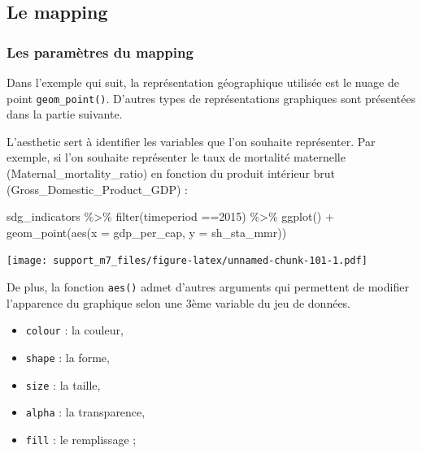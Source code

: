 \documentclass[
]{book}
\newenvironment{Shaded}{\begin{snugshade}}{\end{snugshade}}
\newcommand{\AttributeTok}[1]{\textcolor[rgb]{0.77,0.63,0.00}{#1}}
\newcommand{\DecValTok}[1]{\textcolor[rgb]{0.00,0.00,0.81}{#1}}
\newcommand{\FunctionTok}[1]{\textcolor[rgb]{0.00,0.00,0.00}{#1}}
\newcommand{\NormalTok}[1]{#1}
\newcommand{\SpecialCharTok}[1]{\textcolor[rgb]{0.00,0.00,0.00}{#1}}
\providecommand{\tightlist}{%
  \setlength{\itemsep}{0pt}\setlength{\parskip}{0pt}}
\begin{document}
\hypertarget{le-mapping}{%
\subsection{Le mapping}\label{le-mapping}}

\hypertarget{les-paramuxe8tres-du-mapping}{%
\subsubsection{Les paramètres du mapping}\label{les-paramuxe8tres-du-mapping}}

Dans l'exemple qui suit, la représentation géographique utilisée est le nuage de point \texttt{geom\_point()}.
D'autres types de représentations graphiques sont présentées dans la partie suivante.

L'aesthetic sert à identifier les variables que l'on souhaite représenter.
Par exemple, si l'on souhaite représenter le taux de mortalité maternelle (Maternal\_mortality\_ratio) en fonction du produit intérieur brut (Gross\_Domestic\_Product\_GDP) :

\begin{Shaded}
\begin{Highlighting}[]
\NormalTok{sdg\_indicators }\SpecialCharTok{\%\textgreater{}\%} 
  \FunctionTok{filter}\NormalTok{(timeperiod }\SpecialCharTok{==}\DecValTok{2015}\NormalTok{) }\SpecialCharTok{\%\textgreater{}\%} 
  \FunctionTok{ggplot}\NormalTok{() }\SpecialCharTok{+}
    \FunctionTok{geom\_point}\NormalTok{(}\FunctionTok{aes}\NormalTok{(}\AttributeTok{x =}\NormalTok{ gdp\_per\_cap, }\AttributeTok{y =}\NormalTok{ sh\_sta\_mmr))}
\end{Highlighting}
\end{Shaded}

\texttt{[image: support\_m7\_files/figure-latex/unnamed-chunk-101-1.pdf]}

De plus, la fonction \texttt{aes()} admet d'autres arguments qui permettent de modifier l'apparence du graphique selon une 3ème variable du jeu de données.

\begin{itemize}
\tightlist
\item
  \texttt{colour} : la couleur,
\item
  \texttt{shape} : la forme,
\item
  \texttt{size} : la taille,
\item
  \texttt{alpha} : la transparence,
\item
  \texttt{fill} : le remplissage ;
\end{itemize}
\end{document}
